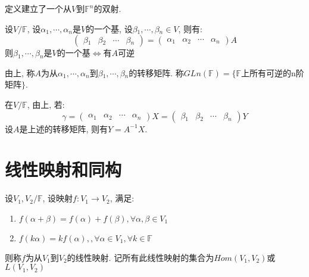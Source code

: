 \begin{example}
    定义建立了一个从$V$到$\mathbb{F}^n$的双射.
\end{example}

\begin{theorem}
    设$V/\mathbb{F}$, 设$\alpha{_1}, \cdots, \alpha{_n}$是$V$的一个基, 设$\beta{_1}, \cdots, \beta{_n} \in V$, 则有:
    \[\begin{pmatrix}
        \beta{_1} & \beta{_2} & \cdots & \beta{_n}
    \end{pmatrix}=\begin{pmatrix}
        \alpha{_1} & \alpha{_2} & \cdots & \alpha{_n}
    \end{pmatrix}A\]
    则$\beta{_1}, \cdots, \beta{_n}$是$V$的一个基$\Longleftrightarrow$有$A$可逆
\end{theorem}

\begin{definition}[转移矩阵]
    由上, 称$A$为从$\alpha{_1}, \cdots, \alpha{_n}$到$\beta{_1}, \cdots, \beta{_n}$的转移矩阵.
    称$GLn(\mathbb{F})=\{\mathbb{F}$上所有可逆的n阶矩阵$\}$.
\end{definition}

\begin{inference}
    在$V/\mathbb{F}$, 由上, 若:
    \[\gamma = \begin{pmatrix}
        \alpha{_1} & \alpha{_2} & \cdots & \alpha{_n}
    \end{pmatrix}X=\begin{pmatrix}
        \beta{_1} & \beta{_2} & \cdots & \beta{_n}
    \end{pmatrix}Y\]
    设$A$是上述的转移矩阵, 则有$Y=A^{-1}X$.
\end{inference}

\section{ 线性映射和同构 }

\begin{definition}[线性映射]
    设$V_1, V_2/\mathbb{F}$, 设映射$f:V_1 \to V_2$, 满足:
    \begin{enumerate}[itemindent=1em]
        \item $f(\alpha + \beta) = f(\alpha) + f(\beta), \forall \alpha, \beta \in V_1$
        \item $f(k\alpha) = kf(\alpha), , \forall \alpha \in V_1, \forall k \in \mathbb{F}$
    \end{enumerate}
    则称$f$为从$V_1$到$V_2$的线性映射. 记所有此线性映射的集合为$Hom(V_1, V_2)$或$L(V_1, V_2)$
\end{definition}


